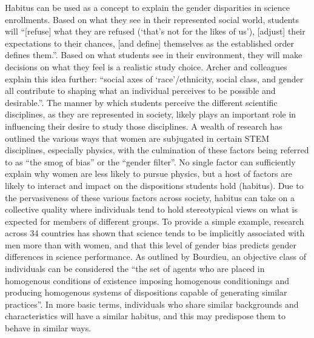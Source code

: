 Habitus can be used as a concept to explain the gender disparities in science enrollments. Based on what they see in their represented social world, students will ``[refuse] what they are refused (`that's not for the likes of us'), [adjust] their expectations to their chances, [and define] themselves as the established order defines them.''.\cite{Bourdieu1984} Based on what students see in their environment, they will make decisions on what they feel is a realistic study choice. Archer and colleagues explain this idea further: ``social axes of `race'/ethnicity, social class, and gender all contribute to shaping what an individual perceives to be possible and desirable.''.\cite{Archer_2012} The manner by which students perceive the different scientific disciplines, as they are represented in society, likely plays an important role in influencing their desire to study those disciplines. 
A wealth of research has outlined the various ways that women are subjugated in certain STEM disciplines, especially physics, with the culmination of these factors being referred to as ``the smog of bias''\cite{Kost_Smith_2010} or the ``gender filter''.\cite{Blickenstaff_2005} No single factor can sufficiently explain why women are less likely to pursue physics\cite{Kost_Smith_2010}, but a host of factors are likely to interact and impact on the dispositions students hold (habitus). Due to the pervasiveness of these various factors across society, habitus can take on a collective quality where individuals tend to hold stereotypical views on what is expected for members of different groups. To provide a simple example, research across 34 countries has shown that science tends to be implicitly associated with men more than with women, and that this level of gender bias predicts gender differences in science performance.\cite{Nosek_2009} As outlined by Bourdieu, an objective class of individuals can be considered the ``the set of agents who are placed in homogenous conditions of existence imposing homogenous conditionings and producing homogenous systems of dispositions capable of generating similar practices''\cite{Bourdieu1984}. In more basic terms, individuals who share similar backgrounds and characteristics will have a similar habitus, and this may predispose them to behave in similar ways.\cite{Reay2004}

